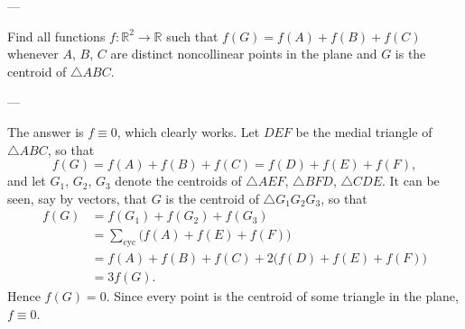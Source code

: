 
---

Find all functions $f:\mathbb R^2\to\mathbb R$ such that $f(G)=f(A)+f(B)+f(C)$ whenever $A$, $B$, $C$ are distinct noncollinear points in the plane and $G$ is the centroid of $\triangle ABC$.

---

The answer is $f\equiv0$, which clearly works. Let $DEF$ be the medial triangle of $\triangle ABC$, so that \[f(G)=f(A)+f(B)+f(C)=f(D)+f(E)+f(F),\]
and let $G_1$, $G_2$, $G_3$ denote the centroids of $\triangle AEF$, $\triangle BFD$, $\triangle CDE$. It can be seen, say by vectors, that $G$ is the centroid of $\triangle G_1G_2G_3$, so that
\begin{align*}
    f(G)&=f(G_1)+f(G_2)+f(G_3)\\
    &=\sum_\mathrm{cyc}\big(f(A)+f(E)+f(F)\big)\\
    &=f(A)+f(B)+f(C)+2\big(f(D)+f(E)+f(F)\big)\\
    &=3f(G).
\end{align*}
Hence $f(G)=0$. Since every point is the centroid of some triangle in the plane, $f\equiv0$.

